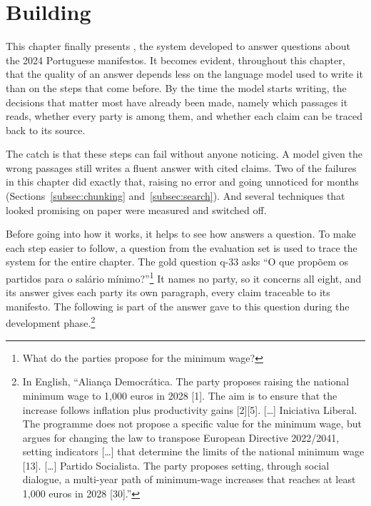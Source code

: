 \providecommand{\TODO}[1]{\textcolor{red}{\textbf{[TODO: #1]}}}

\chapter{Building \sysname{}} \label{ch:proposition}

This chapter finally presents \sysname{}, the system developed to answer
questions about the 2024 Portuguese manifestos. It becomes evident, throughout this
chapter, that the quality of an answer depends less on the language model used to write it than on the steps that come before.
By the time the model starts writing, the decisions that matter most have already been made, namely
which passages it reads, whether every party is among them, and whether each claim can be traced back to its source.

The catch is that these steps can fail without anyone noticing. A model given
the wrong passages still writes a fluent answer with cited claims. Two of the
failures in this chapter did exactly that, raising no error and going
unnoticed for months (Sections~\ref{subsec:chunking}
and~\ref{subsec:search}). And several techniques that looked promising on
paper were measured and switched off.

Before going into how it works, it helps to see how \sysname{} answers a question. To
make each step easier to follow, a question from the evaluation set is used to
trace the system for the entire chapter. The gold question q-33 asks ``O que
propõem os partidos para o salário mínimo?''\footnote{What do the parties
propose for the minimum wage?} It names no party, so it concerns all eight,
and its answer gives each party its own paragraph, every claim traceable to
its manifesto. The following is part of the answer \sysname{} gave to this
question during the development phase.\footnote{In English, ``Aliança
Democrática. The party proposes raising the national minimum wage to 1,000
euros in 2028 [1]. The aim is to ensure that the increase follows inflation
plus productivity gains [2][5]. [\ldots] Iniciativa Liberal. The programme does
not propose a specific value for the minimum wage, but argues for changing
the law to transpose European Directive 2022/2041, setting indicators
[\ldots] that determine the limits of the national minimum wage [13].
[\ldots] Partido Socialista. The party proposes setting, through social
dialogue, a multi-year path of minimum-wage increases that reaches at least
1,000 euros in 2028 [30].''}

